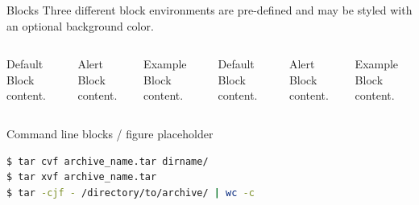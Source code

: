 \documentclass[10pt]{beamer}
\begin{document}
\begin{frame}{Blocks}
  Three different block environments are pre-defined and may be styled with an
  optional background color.

  \begin{columns}[T,onlytextwidth]
      \begin{block}{Default}
        Block content.
      \end{block}

      \begin{alertblock}{Alert}
        Block content.
      \end{alertblock}

      \begin{exampleblock}{Example}
        Block content.
      \end{exampleblock}



      \begin{block}{Default}
        Block content.
      \end{block}

      \begin{alertblock}{Alert}
        Block content.
      \end{alertblock}

      \begin{exampleblock}{Example}
        Block content.
      \end{exampleblock}

  \end{columns}
\end{frame}

\begin{frame}[fragile]{Command line blocks / figure placeholder}

	\begin{lstlisting}[language=bash, style=BLACK]
$ tar cvf archive_name.tar dirname/
$ tar xvf archive_name.tar
$ tar -cjf - /directory/to/archive/ | wc -c
	\end{lstlisting}

	\begin{figure}
	\end{figure}

\end{frame}
\end{document}
